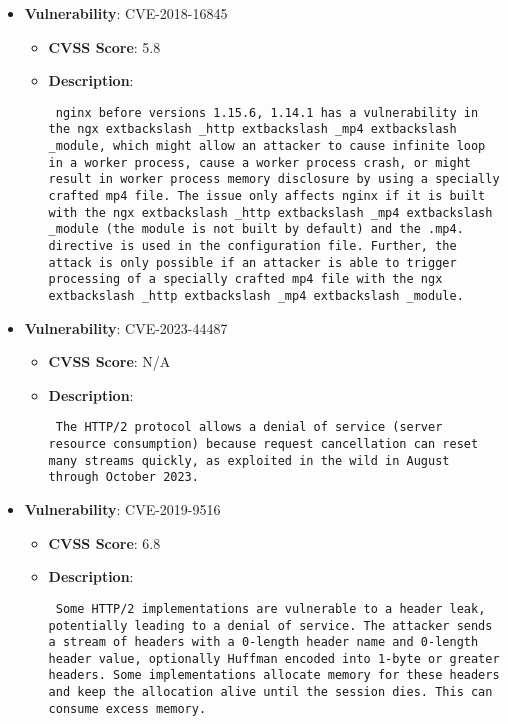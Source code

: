\documentclass{article}
\begin{document}
\begin{itemize}
        \item \textbf{Vulnerability}: CVE-2018-16845
        \begin{itemize}
            \item \textbf{CVSS Score}:  5.8 
            \item \textbf{Description}: \parbox{\linewidth}{\texttt{ nginx before versions 1.15.6, 1.14.1 has a vulnerability in the ngx	extbackslash _http	extbackslash _mp4	extbackslash _module, which might allow an attacker to cause infinite loop in a worker process, cause a worker process crash, or might result in worker process memory disclosure by using a specially crafted mp4 file. The issue only affects nginx if it is built with the ngx	extbackslash _http	extbackslash _mp4	extbackslash _module (the module is not built by default) and the .mp4. directive is used in the configuration file. Further, the attack is only possible if an attacker is able to trigger processing of a specially crafted mp4 file with the ngx	extbackslash _http	extbackslash _mp4	extbackslash _module. }}
        \end{itemize}
    
        \item \textbf{Vulnerability}: CVE-2023-44487
        \begin{itemize}
            \item \textbf{CVSS Score}:  N/A 
            \item \textbf{Description}: \parbox{\linewidth}{\texttt{ The HTTP/2 protocol allows a denial of service (server resource consumption) because request cancellation can reset many streams quickly, as exploited in the wild in August through October 2023. }}
        \end{itemize}
    
        \item \textbf{Vulnerability}: CVE-2019-9516
        \begin{itemize}
            \item \textbf{CVSS Score}:  6.8 
            \item \textbf{Description}: \parbox{\linewidth}{\texttt{ Some HTTP/2 implementations are vulnerable to a header leak, potentially leading to a denial of service. The attacker sends a stream of headers with a 0-length header name and 0-length header value, optionally Huffman encoded into 1-byte or greater headers. Some implementations allocate memory for these headers and keep the allocation alive until the session dies. This can consume excess memory. }}
        \end{itemize}
    

\end{itemize}
\end{document}
